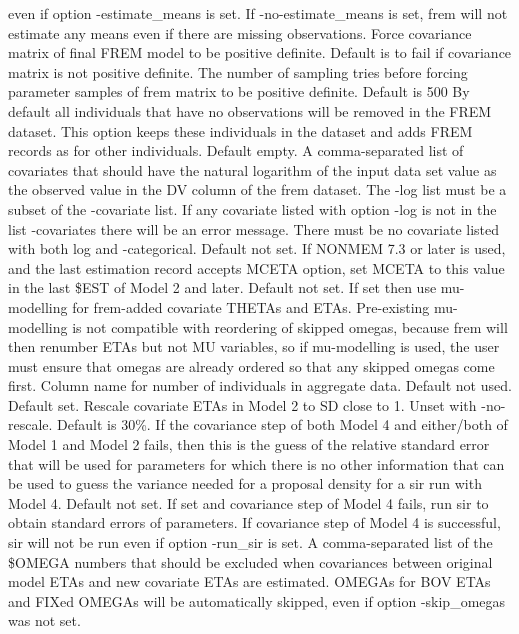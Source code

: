 \begin{optionlist}
even if option -estimate\_means is set. If -no-estimate\_means is set, frem will not estimate
any means even if there are missing observations.
\nextopt
{}
    Force covariance matrix of final FREM model to be positive definite.
    Default is to fail if covariance matrix is not positive definite.
\nextopt
{}
    The number of sampling tries before forcing parameter samples of frem matrix to be positive definite.
    Default is 500
\nextopt
{}
    By default all individuals that have no observations will be removed in the FREM dataset. This option
    keeps these individuals in the dataset and adds FREM records as for other individuals.
\nextopt
{}
Default empty. A comma-separated list of covariates	that should have the natural logarithm of the input data
set value as the observed value in the DV column of the frem dataset. The -log list must be a subset of the
-covariate list. If any covariate listed with option -log is not in the list -covariates there will be an
error message. There must be no covariate listed with both log and -categorical.
\nextopt
{}
Default not set. If NONMEM 7.3 or later is used, and the last estimation record accepts MCETA option, set MCETA to this value
in the last \$EST of Model 2 and later.
\nextopt
{}
Default not set. If set then use mu-modelling for frem-added covariate THETAs and ETAs. Pre-existing
mu-modelling is not compatible with reordering of skipped omegas, because frem will then renumber ETAs
but not MU variables, so if mu-modelling is used, the user must ensure that omegas are already ordered
so that any skipped omegas come first.
\nextopt
{}
Column name for number of individuals in aggregate data. Default not used.
\nextopt
{}
Default set. Rescale covariate ETAs in Model 2 to SD close to 1. Unset with -no-rescale.
\nextopt
{}
Default is 30\%.
If the covariance step of both Model 4 and either/both of Model 1 and Model 2 fails, then this is the guess of the
relative standard error that will be used for parameters for which there is no other information that can be used
to guess the variance needed for a proposal density for a sir run with Model 4.
\nextopt
{}
Default not set. If set and covariance step of Model 4 fails, run sir to obtain standard errors of parameters.
If covariance step of Model 4 is successful, sir will not be run even if option -run\_sir is set.
\nextopt
{}
A comma-separated list of the \$OMEGA numbers that should be excluded when covariances
between original model ETAs and new covariate ETAs are estimated.
OMEGAs for BOV ETAs and FIXed OMEGAs will be automatically skipped,
even if option -skip\_omegas was not set.
\nextopt
\end{optionlist}

